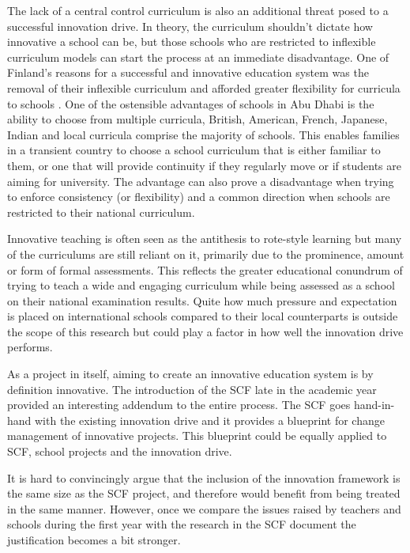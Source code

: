 The lack of a central control curriculum is also an additional threat posed to a successful innovation drive. In theory, the curriculum shouldn't dictate how innovative a school can be, but those schools who are restricted to inflexible curriculum models can start the process at an immediate disadvantage. One of Finland's reasons for a successful and innovative education system was the removal of their inflexible curriculum and afforded greater flexibility for curricula to schools \cite{Simola2005}. One of the ostensible advantages of schools in Abu Dhabi is the ability to choose from multiple curricula, British, American, French, Japanese, Indian and local curricula comprise the majority of schools. This enables families in a transient country to choose a school curriculum that is either familiar to them, or one that will provide continuity if they regularly move or if students are aiming for university. The advantage can also prove a disadvantage when trying to enforce consistency (or flexibility) and a common direction when schools are restricted to their national curriculum.

Innovative teaching is often seen as the antithesis to rote-style learning but many of the curriculums are still reliant on it, primarily due to the prominence, amount or form of formal assessments. This reflects the greater educational conundrum of trying to teach a wide and engaging curriculum while being assessed as a school on their national examination results. Quite how much pressure and expectation is placed on international schools compared to their local counterparts is outside the scope of this research but could play a factor in how well the innovation drive performs.

As a project in itself, aiming to create an innovative education system is by definition innovative. The introduction of the SCF late in the academic year provided an interesting addendum to the entire process. The SCF goes hand-in-hand with the existing innovation drive and it provides a blueprint for change management of innovative projects. This blueprint could be equally applied to SCF, school projects and the innovation drive.

It is hard to convincingly argue that the inclusion of the innovation framework is the same size as the SCF project, and therefore would benefit from being treated in the same manner. However, once we compare the issues raised by teachers and schools during the first year with the research in the SCF document the justification becomes a bit stronger.

